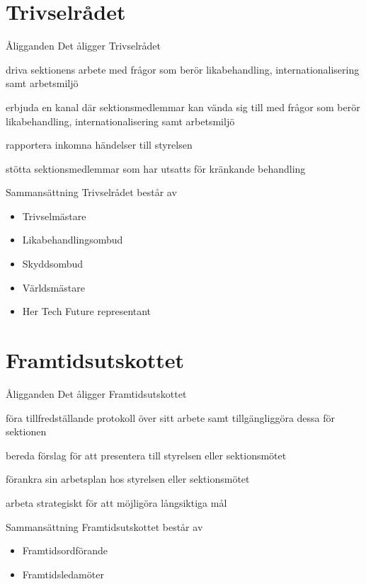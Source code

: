 \documentclass[pdfbookmarks,a4paper,11pt]{article}
\newlength{\itemcollength}
\newenvironment{reglemlista}{%
  \begin{list}{}{%
      \setlength{\labelwidth}{\itemcollength}%
      \setlength{\leftmargin}{\labelwidth + \labelsep}%
      \renewcommand{\makelabel}[1]{%
        \raisebox{0pt}[1ex][0pt]{%
          \makebox[\labelwidth][l]{%
            \parbox[t]{\itemcollength}{%
              \raggedright\hspace{0pt}##1}}}\hfill}%
      }}{%
  \end{list}}
\begin{document}
\section{Trivselrådet}

\begin{reglemlista}

	\item[Åligganden]
	Det åligger Trivselrådet
	\begin{attlista}
		\item driva sektionens arbete med frågor som berör likabehandling, internationalisering samt arbetsmiljö
		\item erbjuda en kanal där sektionsmedlemmar kan vända sig till med frågor som berör likabehandling, internationalisering samt arbetsmiljö
		\item rapportera inkomna händelser till styrelsen
		\item stötta sektionsmedlemmar som har utsatts för kränkande behandling
	\end{attlista}
	\item[Sammansättning]
	Trivselrådet består av
	\begin{itemize}
		\item Trivselmästare
		\item Likabehandlingsombud
		\item Skyddsombud
		\item Världsmästare
		\item Her Tech Future representant
	\end{itemize}

\end{reglemlista}

\section{Framtidsutskottet}

\begin{reglemlista}

	\item[Åligganden]
	Det åligger Framtidsutskottet
	\begin{attlista}
		\item föra tillfredställande protokoll över sitt arbete samt tillgängliggöra dessa för sektionen
		\item bereda förslag för att presentera till styrelsen eller sektionsmötet
		\item  förankra sin arbetsplan hos styrelsen eller sektionsmötet
		\item arbeta strategiskt för att möjligöra långsiktiga mål
	\end{attlista}
	\item[Sammansättning]
	Framtidsutskottet består av
	\begin{itemize}
		\item Framtidsordförande
		\item Framtidsledamöter
	\end{itemize}

\end{reglemlista}
\end{document}
